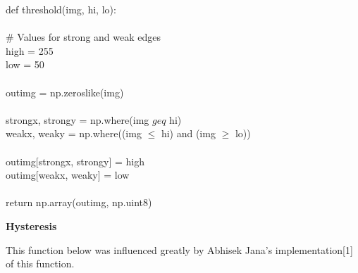 \documentclass{article}
\begin{document}
	\noindent def threshold(img, hi, lo):\\
	\\
	\indent \# Values for strong and weak edges\\
	\indent high = 255\\
	\indent low = 50\\
	\\
	\indent out\textunderscore img = np.zeros\textunderscore like(img)\\
	\\
	\indent strong\textunderscore x, strong\textunderscore y = np.where(img $geq$ hi)\\
	\indent weak\textunderscore x, weak\textunderscore y = np.where((img $\leq$ hi) and (img $\geq$ lo))\\
	\\
	\indent out\textunderscore img[strong\textunderscore x, strong\textunderscore y] = high\\
	\indent out\textunderscore img[weak\textunderscore x, weak\textunderscore y] = low\\
	\\
	\indent return np.array(out\textunderscore img, np.uint8)\\
	
	\smallskip
	
	\textbf{Hysteresis}
	
	This function below was influenced greatly by Abhisek Jana's implementation[1] of this function.\\
	
\end{document}
